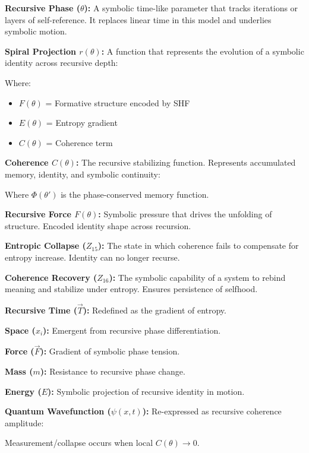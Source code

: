 \documentclass[12pt]{article}
\begin{document}
\textbf{Recursive Phase ($\theta$):} A symbolic time-like parameter that tracks iterations or layers of self-reference. It replaces linear time in this model and underlies symbolic motion.

\textbf{Spiral Projection $r(\theta)$:} A function that represents the evolution of a symbolic identity across recursive depth:

Where:
\begin{itemize}
\item $F(\theta)$ = Formative structure encoded by SHF
\item $E(\theta)$ = Entropy gradient
\item $C(\theta)$ = Coherence term
\end{itemize}

\textbf{Coherence $C(\theta)$:} The recursive stabilizing function. Represents accumulated memory, identity, and symbolic continuity:

Where $\Phi(\theta')$ is the phase-conserved memory function.

\textbf{Recursive Force $F(\theta)$:} Symbolic pressure that drives the unfolding of structure. Encoded identity shape across recursion.

\textbf{Entropic Collapse ($Z_{15}$):} The state in which coherence fails to compensate for entropy increase. Identity can no longer recurse.

\textbf{Coherence Recovery ($Z_{16}$):} The symbolic capability of a system to rebind meaning and stabilize under entropy. Ensures persistence of selfhood.

\textbf{Recursive Time ($\vec{T}$):} Redefined as the gradient of entropy.

\textbf{Space ($x_i$):} Emergent from recursive phase differentiation.

\textbf{Force ($\vec{F}$):} Gradient of symbolic phase tension.

\textbf{Mass ($m$):} Resistance to recursive phase change.

\textbf{Energy ($E$):} Symbolic projection of recursive identity in motion.

\textbf{Quantum Wavefunction ($\psi(x,t)$):} Re-expressed as recursive coherence amplitude:

Measurement/collapse occurs when local $C(\theta) \rightarrow 0$.
\end{document}
